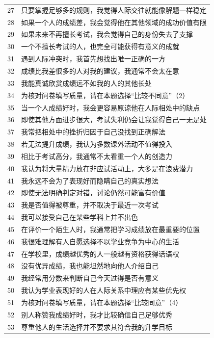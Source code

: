 \documentclass[11pt,a4paper,UTF8,fontset=none]{ctexart}
\begin{document}
\begin{longtable}{@{}p{1.2cm}p{14.5cm}@{}}
27&只要掌握足够多的规则，我觉得人际交往就能像解题一样稳定\\[3pt]
28&如果一个人的成绩差，我会觉得他在其他领域的成功价值有限\\[3pt]
29&如果未来不再擅长考试，我会觉得自己的身份失去了支撑\\[3pt]
30&一个不擅长考试的人，也完全可能获得有意义的成就\\[3pt]
31&遇到人际冲突时，我首先想找出唯一正确的一方\\[3pt]
32&成绩比我差很多的人对我的建议，我通常不会太在意\\[3pt]
33&我能真诚欣赏成绩远不如我的人的其他长处\\[3pt]
34&为核对问卷填写质量，请在本题选择“比较不同意”（2）\\[3pt]
35&当一个人成绩好时，我会更容易原谅他在人际相处中的缺点\\[3pt]
36&即使其他方面进步很大，考试失利仍会让我觉得自己一无是处\\[3pt]
37&我常把相处中的挫折归因于自己没找到正确解法\\[3pt]
38&若无法提升成绩，我认为多数课外活动不值得投入\\[3pt]
39&相比于考试高分，我通常不太看重一个人的创造力\\[3pt]
40&我认为将大量精力放在非应试活动上，大多是在浪费潜力\\[3pt]
41&我永远不会为了表现好而隐瞒自己的真实想法\\[3pt]
42&即使无法明确判定对错，讨论仍然可能富有价值\\[3pt]
43&我是否值得被尊重，并不取决于最近一次考试\\[3pt]
44&我可以接受自己在某些学科上并不出色\\[3pt]
45&在评价一个陌生人时，我通常把学习成绩放在最重要的位置\\[3pt]
46&我很难理解有人自愿选择不以学业竞争为中心的生活\\[3pt]
47&在学校里，成绩越优秀的人一般越有资格获得话语权\\[3pt]
48&没有优异成绩，我也能坦然地向他人介绍自己\\[3pt]
49&我经常用分数来判断自己今天过得是否有意义\\[3pt]
50&我认为学业表现好的人在人际关系中理应有某些优先权\\[3pt]
51&为核对问卷填写质量，请在本题选择“比较同意”（4）\\[3pt]
52&别人称赞我成绩好时，我才比较确信自己足够优秀\\[3pt]
53&尊重他人的生活选择并不要求其符合我的升学目标\\[3pt]

\end{longtable}
\end{document}
